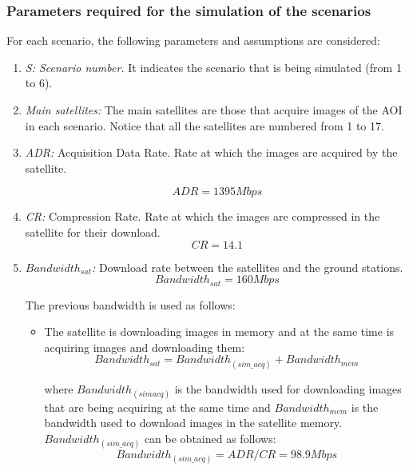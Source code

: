 \subsubsection{Parameters required for the simulation of the scenarios}
\label{subsubsec:parameters-required}
For each scenario, the following parameters and assumptions are considered:
\begin{enumerate}
\item \emph{S: Scenario number.} It indicates the scenario that is being simulated (from 1 to 6). 
\item \emph{Main satellites:} The main satellites are those that acquire images of the AOI in each scenario. Notice that all the satellites are numbered from 1 to 17.
\item \emph{ADR:} Acquisition Data Rate. Rate at which the images are acquired
  by the satellite.

\begin{equation} \label{eq:ADR}
ADR=1395Mbps
\end{equation}

\item \emph{CR:} Compression Rate. Rate at which the images are compressed in
  the satellite for their download.
\begin{equation}\label{eq:CR}
CR=14.1	
\end{equation}
\item \emph{$Bandwidth_{sat}$:} Download rate between the satellites and the
  ground stations.
\begin{equation}\label{eq:Bandwidth}
Bandwidth_{sat}=160Mbps
\end{equation}

The previous bandwidth is used as follows:
\begin{itemize}
\item The satellite is downloading images in memory and at the same time is
  acquiring images and downloading them:
\begin{equation}\label{eq:totalBandwidth}
Bandwidth_{sat}=Bandwidth_{(sim\_acq)}+Bandwidth_{mem}
\end{equation}

where $Bandwidth_{(sim_{}acq)}$ is the bandwidth used for downloading images that
are being acquiring at the same time and $Bandwidth_{mem}$ is the bandwidth used
to download images in the satellite memory. $Bandwidth_{(sim\_acq)}$ can be
obtained as follows:
\begin{equation}\label{eq:bandwidth-sim}
  Bandwidth_{(sim\_acq)}=ADR/CR=98.9Mbps
\end{equation}


\end{itemize}
\end{enumerate}
